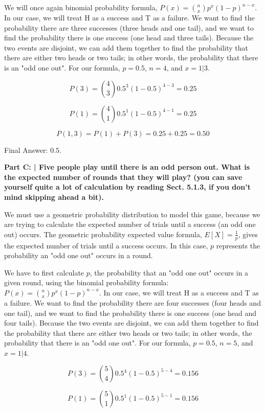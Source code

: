 \documentclass{article}
\begin{document}
 We will once again binomial probability formula, $P(x)={n \choose x}p^x(1-p)^{n-x}$. In our case, we will treat H as a success and T as a failure. We want to find the probability there are three successes (three heads and one tail), and we want to find the probability there is one success (one head and three tails). Because the two events are disjoint, we can add them together to find the probability that there are either two heads or two tails; in other words, the probability that there is an "odd one out". For our formula, $p = 0.5$, $n = 4$, and $x = 1 | 3$.
 
 \[P(3)={4 \choose 3}0.5^3(1-0.5)^{4-3} = 0.25\]
 
 \[P(1)={4 \choose 1}0.5^1(1-0.5)^{4-1} = 0.25\]
 
 \[P(1, 3)=P(1)+P(3) = 0.25 + 0.25 = 0.50\]
 
 Final Answer: $0.5$.\newline
 
 \textbf{Part C: | Five people play until there is an odd person out. What is the expected number of rounds that they will play? (you can save yourself quite a lot of calculation by reading Sect. 5.1.3, if you don’t mind skipping ahead a bit).}\newline
 
 We must use a geometric probability distribution to model this game, because we are trying to calculate the expected number of trials until a success (an odd one out) occurs. The geometric probability expected value formula, $E[X] = \frac{1}{p}$, gives the expected number of trials until a success occurs. In this case, $p$ represents the probability an "odd one out" occurs in a round.
 
 We have to first calculate $p$, the probability that an "odd one out" occurs in a given round, using the binomial probability formula: $P(x)={n \choose x}p^x(1-p)^{n-x}$. In our case, we will treat H as a success and T as a failure. We want to find the probability there are four successes (four heads and one tail), and we want to find the probability there is one success (one head and four tails). Because the two events are disjoint, we can add them together to find the probability that there are either two heads or two tails; in other words, the probability that there is an "odd one out". For our formula, $p = 0.5$, $n = 5$, and $x = 1 | 4$. \newline
 
 \[P(3)={5 \choose 4}0.5^4(1-0.5)^{5-4} = 0.156\]
 
 \[P(1)={5 \choose 1}0.5^1(1-0.5)^{5-1} = 0.156\]
 
\end{document}
